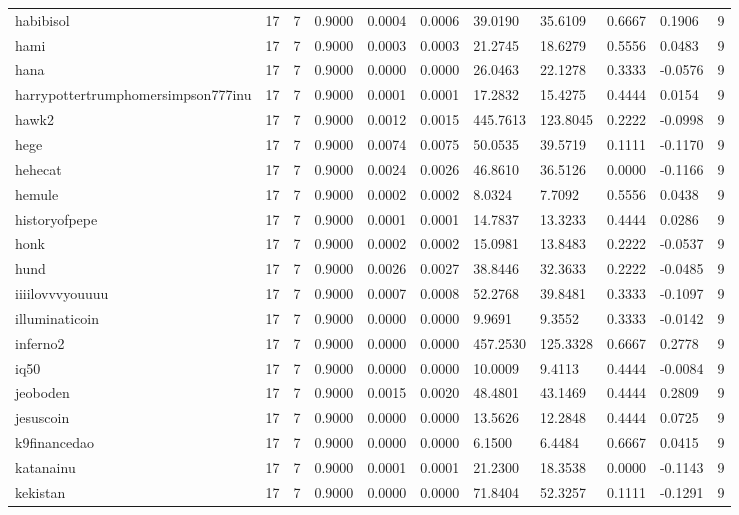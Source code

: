 \begin{table}[htbp]
\begin{tabular}{lllllllllll}
habibisol & 17 & 7 & 0.9000 & 0.0004 & 0.0006 & 39.0190 & 35.6109 & 0.6667 & 0.1906 & 9 \\
hami & 17 & 7 & 0.9000 & 0.0003 & 0.0003 & 21.2745 & 18.6279 & 0.5556 & 0.0483 & 9 \\
hana & 17 & 7 & 0.9000 & 0.0000 & 0.0000 & 26.0463 & 22.1278 & 0.3333 & -0.0576 & 9 \\
harrypottertrumphomersimpson777inu & 17 & 7 & 0.9000 & 0.0001 & 0.0001 & 17.2832 & 15.4275 & 0.4444 & 0.0154 & 9 \\
hawk2 & 17 & 7 & 0.9000 & 0.0012 & 0.0015 & 445.7613 & 123.8045 & 0.2222 & -0.0998 & 9 \\
hege & 17 & 7 & 0.9000 & 0.0074 & 0.0075 & 50.0535 & 39.5719 & 0.1111 & -0.1170 & 9 \\
hehecat & 17 & 7 & 0.9000 & 0.0024 & 0.0026 & 46.8610 & 36.5126 & 0.0000 & -0.1166 & 9 \\
hemule & 17 & 7 & 0.9000 & 0.0002 & 0.0002 & 8.0324 & 7.7092 & 0.5556 & 0.0438 & 9 \\
historyofpepe & 17 & 7 & 0.9000 & 0.0001 & 0.0001 & 14.7837 & 13.3233 & 0.4444 & 0.0286 & 9 \\
honk & 17 & 7 & 0.9000 & 0.0002 & 0.0002 & 15.0981 & 13.8483 & 0.2222 & -0.0537 & 9 \\
hund & 17 & 7 & 0.9000 & 0.0026 & 0.0027 & 38.8446 & 32.3633 & 0.2222 & -0.0485 & 9 \\
iiiilovvvyouuuu & 17 & 7 & 0.9000 & 0.0007 & 0.0008 & 52.2768 & 39.8481 & 0.3333 & -0.1097 & 9 \\
illuminaticoin & 17 & 7 & 0.9000 & 0.0000 & 0.0000 & 9.9691 & 9.3552 & 0.3333 & -0.0142 & 9 \\
inferno2 & 17 & 7 & 0.9000 & 0.0000 & 0.0000 & 457.2530 & 125.3328 & 0.6667 & 0.2778 & 9 \\
iq50 & 17 & 7 & 0.9000 & 0.0000 & 0.0000 & 10.0009 & 9.4113 & 0.4444 & -0.0084 & 9 \\
jeoboden & 17 & 7 & 0.9000 & 0.0015 & 0.0020 & 48.4801 & 43.1469 & 0.4444 & 0.2809 & 9 \\
jesuscoin & 17 & 7 & 0.9000 & 0.0000 & 0.0000 & 13.5626 & 12.2848 & 0.4444 & 0.0725 & 9 \\
k9financedao & 17 & 7 & 0.9000 & 0.0000 & 0.0000 & 6.1500 & 6.4484 & 0.6667 & 0.0415 & 9 \\
katanainu & 17 & 7 & 0.9000 & 0.0001 & 0.0001 & 21.2300 & 18.3538 & 0.0000 & -0.1143 & 9 \\
kekistan & 17 & 7 & 0.9000 & 0.0000 & 0.0000 & 71.8404 & 52.3257 & 0.1111 & -0.1291 & 9 \\

\end{tabular}
\end{table}
